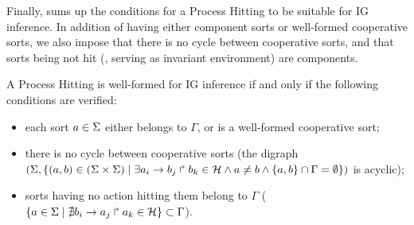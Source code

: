 Finally,  sums up the conditions for a Process Hitting to be suitable for IG
inference.
In addition of having either component sorts or well-formed cooperative sorts, we also impose that
there is no cycle between cooperative sorts, and that
sorts being not hit (\ie{}, serving as invariant environment) are components.

\begin{property}\label{pro:wf-ph}
A Process Hitting is well-formed for IG inference if and only if the following conditions are
verified:
\begin{itemize}
\item 
each sort $a\in\Sigma$ either belongs to $\Gamma$, or is a well-formed cooperative sort;
\item 
there is no cycle between cooperative sorts
(the digraph $(\Sigma,\{(a,b)\in(\Sigma\times\Sigma)\mid \exists a_i\rightarrow b_j\Rsh b_k\in\mathcal{H}
\wedge a\neq b\wedge \{a,b\}\cap\Gamma=\emptyset \})$ is
acyclic);
\item 
sorts having no action hitting them belong to $\Gamma$
($\{ a \in \Sigma\mid \nexists b_i\rightarrow a_j\Rsh a_k\in\mathcal{H}\} \subset \Gamma$).
\end{itemize}
\end{property}

